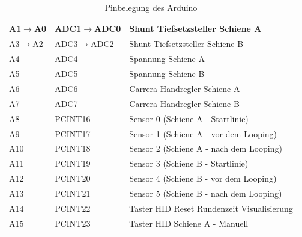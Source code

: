 \documentclass[a4paper, 11pt]{report}
\begin{document}
\begin{table}[hb]
\begin{tabular}{|l|l|l|}
			A1$\rightarrow$A0 & ADC1$\rightarrow$ADC0 & Shunt Tiefsetzsteller Schiene A\\
			\hline
			A3$\rightarrow$A2 & ADC3$\rightarrow$ADC2 & Shunt Tiefsetzsteller Schiene B\\
			\hline
			A4 & ADC4 & Spannung Schiene A\\
			\hline
			A5 & ADC5 & Spannung Schiene B\\
			\hline
			A6 & ADC6 & Carrera Handregler Schiene A\\
			\hline
			A7 & ADC7 & Carrera Handregler Schiene B\\
			\hline
			A8 & PCINT16 & Sensor 0 (Schiene A - Startlinie)\\
			\hline
			A9 & PCINT17 & Sensor 1 (Schiene A - vor dem Looping)\\
			\hline
			A10 & PCINT18 & Sensor 2 (Schiene A - nach dem Looping)\\
			\hline
			A11 & PCINT19 & Sensor 3 (Schiene B - Startlinie)\\
			\hline
			A12 & PCINT20 & Sensor 4 (Schiene B - vor dem Looping)\\
			\hline
			A13 & PCINT21 & Sensor 5 (Schiene B - nach dem Looping)\\
			\hline
			A14 & PCINT22 & Taster HID \glqq Reset Rundenzeit Visualisierung\grqq \\
			\hline
			A15 & PCINT23 & Taster HID \glqq Schiene A - Manuell\grqq \\
			\hline
		\end{tabular}
		\caption{Pinbelegung des Arduino}
		\label{tab:AnhangBelegungArduino}
	\end{table}

	\clearpage
	
	
	
	
\end{document}
